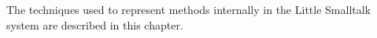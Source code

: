 \secdown

The techniques used to represent methods internally in the Little Smalltalk
system are described in this chapter.


\secup
